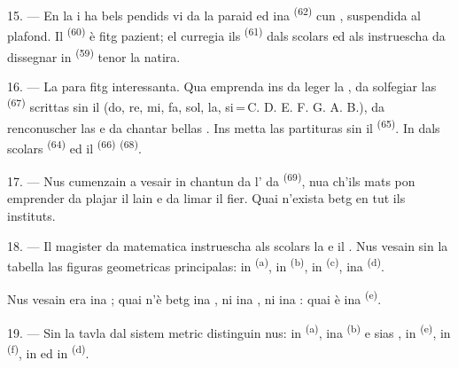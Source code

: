 \VUsaut{4.6mm}
\VUsaut{3.4mm}

15. --- En la  i ha bels  pendids vi da la
paraid ed ina  \textsuperscript{(62)} cun ,
suspendida al plafond. Il  \textsuperscript{(60)} è fitg pazient;
el curregia ils  \textsuperscript{(61)} dals scolars ed als
instruescha da dissegnar in  \textsuperscript{(59)} tenor la natira.

16. --- La  para fitg interessanta. Qua emprenda ins da
leger la , da solfegiar las 
\textsuperscript{(67)} scrittas sin il  (do, re, mi, fa,
sol, la, si\,=\,C. D. E. F. G. A. B.), da renconuscher las  e da
chantar bellas . Ins metta las partituras sin il 
\textsuperscript{(65)}. In dals scolars 
\textsuperscript{(64)} ed il  \textsuperscript{(66)}
 \textsuperscript{(68)}.

17. --- Nus cumenzain a vesair in chantun da l' da  \textsuperscript{(69)}, nua ch'ils mats pon emprender da plajar il lain e
da limar il fier. Quai n'exista betg en tut ils instituts.

\VUsaut{5.0mm}
\VUsaut{3.6mm}

18. --- Il magister da matematica instruescha als scolars la  e il . Nus vesain sin la tabella las
figuras geometricas principalas: in  \textsuperscript{(a)}, in
 \textsuperscript{(b)}, in  \textsuperscript{(c)},
ina  \textsuperscript{(d)}.

Nus vesain era ina ; quai n'è betg ina , ni ina
, ni ina : quai è ina 
\textsuperscript{(e)}.

19. --- Sin la tavla dal sistem metric distinguin nus: in 
\textsuperscript{(a)}, ina  \textsuperscript{(b)} e sias
, in  \textsuperscript{(e)}, in 
\textsuperscript{(f)}, in  ed in 
\textsuperscript{(d)}.

